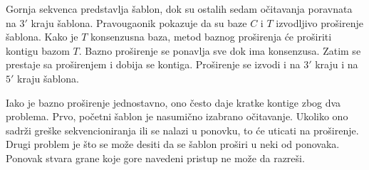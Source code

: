 \documentclass[12pt,oneside]{memoir}
\begin{document}
Gornja sekvenca predstavlja šablon, dok su ostalih sedam očitavanja poravnata na $3'$ kraju šablona. Pravougaonik pokazuje da su baze $C$ i $T$ izvodljivo proširenje šablona. Kako je $T$ konsenzusna baza, metod baznog proširenja će proširiti kontigu bazom $T$. Bazno proširenje se ponavlja sve dok ima konsenzusa. Zatim se prestaje sa proširenjem i dobija se kontiga. Proširenje se izvodi i na $3'$ kraju i na $5'$ kraju šablona.

\begin{comment}
Slika \ref{fig:8} daje pseudokod ovog metoda:

\begin{figure}[!ht]
\centering
\texttt{[image: SimpleAsembler5\_13.PNG]}
\caption{Jednostavan base-by-base asembler proširenja}
\label{fig:8}
\source{\cite{WingKinSung} str. 138, slika 5.13}
\end{figure}

\end{comment}

Iako je bazno proširenje jednostavno, ono često daje kratke kontige zbog dva problema. Prvo, početni šablon je nasumično izabrano očitavanje. Ukoliko ono sadrži greške sekvencioniranja ili se nalazi u ponovku, to će uticati na proširenje. Drugi problem je što se može desiti da se šablon proširi u neki od ponovaka. Ponovak stvara grane koje gore navedeni pristup ne može da razreši.

\begin{comment}
Da bismo rešili prvi problem, biramo očitavanje za šablon, ako je malo verovatno da ono sadrži grešku sekvenciranja ili ako je malo verovatno da će biti u ponovljenom regionu. Koristeći ideju u sekciji 5.3.1, broje se frekvencije svih k-mera svih očitavanja. Očitavanje R se bira za šablon, ako su frekvencije svih njegovih k-mera unutar nekih korisnički definisanih pragova $\theta_{min}$ i $\theta_{max}$. Ako je broj pojavljivanja nekog k-mera manji od $\theta_{min}$, R će verovatno sadržati grešku sekvenciranja. Ako je broj pojavljivanja nekog k-mera veći od $\theta_{max}$, R će se verovatno naći u ponovljenom regionu. Ova dva praga mogu biti određena proučavanjem histograma frekvencija svih k-mera ulaznih sekvenci očitavanja.

Za drugi problem, rešenje je korišćenje informacija o povezivanju paired-end očitavanja za rešavanje nasumičnosti. Ovaj pristup je korišćen od strane $PE-asemblera [9]$. Figura 5.14 ilustruje tu ideju. Pretpostavimo da možemo proširiti šablon koristeći 2 različita očitavanja (crno i sivo). Ne možemo odlučiti koje je ispravo (pogledati Figuru 5.14(a)). Kako svako očitavanje ima svog para, možemo biti u stanju da donesemo odluku. Postoje 2 slučaja. U prvom slučaju, ako parnjak crnom očitavanju može biti poravnat sa šablonom, možemo verovati crnom očitavanju (Figura 5.14(b)). U drugom slučaju, pretpostavimo  da postoji nekoliko očitavanja R koja su poravnata sa šablonom i parnjaci od R mogu biti poravnati sa panjakom crnog očitavanja (pogledati Figuru 5.14(c)). Onda možemo verovati i crnom očitavanju. Drugim rečima, informacije o povezanosti paired-end očitavanja mogu pomoći u  filtriranju onih lažno pozitivnih poravnanja.
\end{comment}
\end{document}
